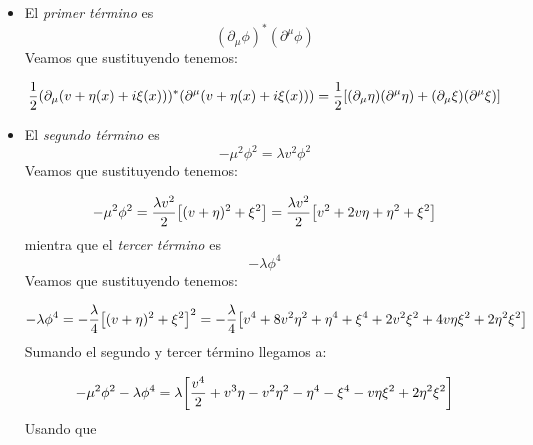 \begin{itemize}
	\item El \textit{primer término} es 
	\begin{equation}
		(\partial_\mu \phi)^* (\partial^\mu \phi)
	\end{equation}
	Veamos que sustituyendo tenemos: 

	\begin{equation}
		\frac{1}{2}(\partial_\mu (v + \eta(x) + i\xi(x)))^* (\partial^\mu (v + \eta(x) + i\xi(x))) = \frac{1}{2}  \bqty{(\partial_\mu \eta)(\partial^\mu \eta) + (\partial_\mu \xi)(\partial^\mu \xi) } 
	\end{equation}
	\item El \textit{segundo término} es 
	\begin{equation}
		- \mu^2 \phi^2 =  \lambda v^2 \phi^2
	\end{equation}
	Veamos que sustituyendo tenemos: 

	\begin{equation}
		- \mu^2 \phi^2 = \frac{\lambda v^2}{2} \bqty{(v + \eta)^2 + \xi^2} =
		\frac{\lambda v^2}{2} \bqty{v^2 + 2v\eta + \eta^2 + \xi^2}  
	\end{equation}
	mientra que el \textit{tercer término} es 
	\begin{equation}
		-\lambda \phi^4 
	\end{equation}
	Veamos que sustituyendo tenemos: 

	\begin{equation}
		-\lambda \phi^4  = -\frac{\lambda}{4} \bqty{(v + \eta)^2 + \xi^2}^2 = -
		\frac{\lambda}{4} \bqty{v^4 + 8v^2\eta^2 + \eta^4 + \xi^4 + 2 v^2 \xi^2 + 4 v \eta \xi^2 + 2 \eta^2 \xi^2}  
	\end{equation}
	Sumando el segundo y tercer término llegamos a: 

	\begin{equation}
		- \mu^2 \phi^2 -\lambda \phi^4  = \lambda\bqty{\frac{v^4}{2}+ v^3 \eta - {v^2 \eta^2} - \eta^4 - \xi^4 - v \eta \xi^2 + 2 \eta^2 \xi^2 }
	\end{equation}
	Usando que 


\end{itemize}
